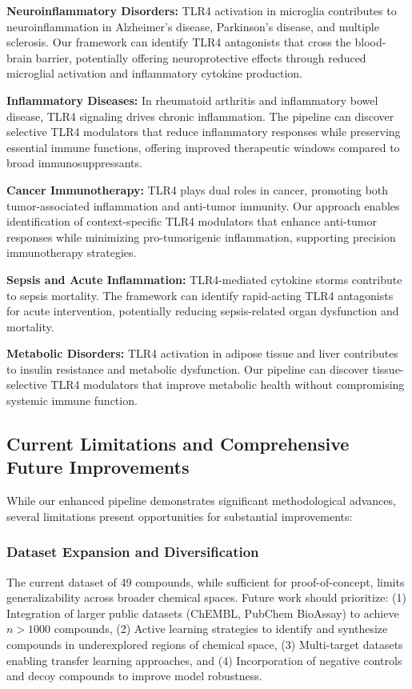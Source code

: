 \documentclass[preprint, 10pt]{elsarticle}
\begin{document}
\textbf{Neuroinflammatory Disorders:} TLR4 activation in microglia contributes to neuroinflammation in Alzheimer's disease, Parkinson's disease, and multiple sclerosis. Our framework can identify TLR4 antagonists that cross the blood-brain barrier, potentially offering neuroprotective effects through reduced microglial activation and inflammatory cytokine production.

\textbf{Inflammatory Diseases:} In rheumatoid arthritis and inflammatory bowel disease, TLR4 signaling drives chronic inflammation. The pipeline can discover selective TLR4 modulators that reduce inflammatory responses while preserving essential immune functions, offering improved therapeutic windows compared to broad immunosuppressants.

\textbf{Cancer Immunotherapy:} TLR4 plays dual roles in cancer, promoting both tumor-associated inflammation and anti-tumor immunity. Our approach enables identification of context-specific TLR4 modulators that enhance anti-tumor responses while minimizing pro-tumorigenic inflammation, supporting precision immunotherapy strategies.

\textbf{Sepsis and Acute Inflammation:} TLR4-mediated cytokine storms contribute to sepsis mortality. The framework can identify rapid-acting TLR4 antagonists for acute intervention, potentially reducing sepsis-related organ dysfunction and mortality.

\textbf{Metabolic Disorders:} TLR4 activation in adipose tissue and liver contributes to insulin resistance and metabolic dysfunction. Our pipeline can discover tissue-selective TLR4 modulators that improve metabolic health without compromising systemic immune function.

\subsection{Current Limitations and Comprehensive Future Improvements}

While our enhanced pipeline demonstrates significant methodological advances, several limitations present opportunities for substantial improvements:

\subsubsection{Dataset Expansion and Diversification}
The current dataset of 49 compounds, while sufficient for proof-of-concept, limits generalizability across broader chemical spaces. Future work should prioritize: (1) Integration of larger public datasets (ChEMBL, PubChem BioAssay) to achieve $n > 1000$ compounds, (2) Active learning strategies to identify and synthesize compounds in underexplored regions of chemical space, (3) Multi-target datasets enabling transfer learning approaches, and (4) Incorporation of negative controls and decoy compounds to improve model robustness.
\end{document}
